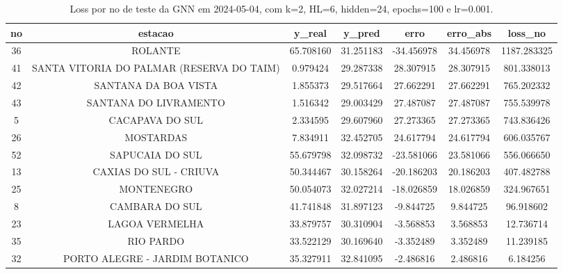 \begin{table}[h]
\centering
\caption{Loss por no de teste da GNN em 2024-05-04, com k=2, HL=6, hidden=24, epochs=100 e lr=0.001.}
\label{tab:gnn_loss_k2_hl6_h24_e100_d20240504}
\begin{tabular}{ccccccc}
\toprule
no & estacao & y\_real & y\_pred & erro & erro\_abs & loss\_no \\
\midrule
36 & ROLANTE & 65.708160 & 31.251183 & -34.456978 & 34.456978 & 1187.283325 \\
41 & SANTA VITORIA DO PALMAR (RESERVA DO TAIM) & 0.979424 & 29.287338 & 28.307915 & 28.307915 & 801.338013 \\
42 & SANTANA DA BOA VISTA & 1.855373 & 29.517664 & 27.662291 & 27.662291 & 765.202332 \\
43 & SANTANA DO LIVRAMENTO & 1.516342 & 29.003429 & 27.487087 & 27.487087 & 755.539978 \\
5 & CACAPAVA DO SUL & 2.334595 & 29.607960 & 27.273365 & 27.273365 & 743.836426 \\
26 & MOSTARDAS & 7.834911 & 32.452705 & 24.617794 & 24.617794 & 606.035767 \\
52 & SAPUCAIA DO SUL & 55.679798 & 32.098732 & -23.581066 & 23.581066 & 556.066650 \\
13 & CAXIAS DO SUL - CRIUVA & 50.344467 & 30.158264 & -20.186203 & 20.186203 & 407.482788 \\
25 & MONTENEGRO & 50.054073 & 32.027214 & -18.026859 & 18.026859 & 324.967651 \\
8 & CAMBARA DO SUL & 41.741848 & 31.897123 & -9.844725 & 9.844725 & 96.918602 \\
23 & LAGOA VERMELHA & 33.879757 & 30.310904 & -3.568853 & 3.568853 & 12.736714 \\
35 & RIO PARDO & 33.522129 & 30.169640 & -3.352489 & 3.352489 & 11.239185 \\
32 & PORTO ALEGRE - JARDIM BOTANICO & 35.327911 & 32.841095 & -2.486816 & 2.486816 & 6.184256 \\
\bottomrule
\end{tabular}
\end{table}
